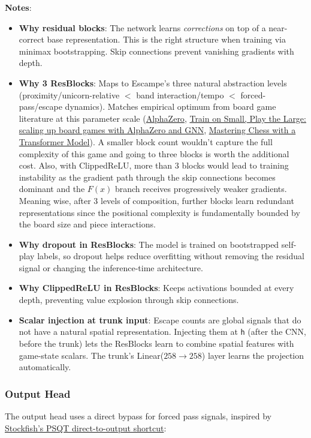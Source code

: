 \documentclass[11pt,a4paper]{article}
\begin{document}
\textbf{Notes}:
\begin{itemize}
  \item \textbf{Why residual blocks}: The network learns \emph{corrections} on top of a near-correct base representation. This is the right structure when training via minimax bootstrapping. Skip connections prevent vanishing gradients with depth.
  \item \textbf{Why 3 ResBlocks}: Maps to Escampe's three natural abstraction levels (proximity/unicorn-relative $<$ band interaction/tempo $<$ forced-pass/escape dynamics). Matches empirical optimum from board game literature at this parameter scale (\href{https://en.wikipedia.org/wiki/AlphaZero}{AlphaZero}, \href{https://arxiv.org/pdf/2107.08387}{Train on Small, Play the Large: scaling up board games with AlphaZero and GNN}, \href{https://arxiv.org/html/2409.12272v1#S6}{Mastering Chess with a Transformer Model}). A smaller block count wouldn't capture the full complexity of this game and going to three blocks is worth the additional cost. Also, with ClippedReLU, more than 3 blocks would lead to training instability as the gradient path through the skip connections becomes dominant and the $F(x)$ branch receives progressively weaker gradients. Meaning wise, after 3 levels of composition, further blocks learn redundant representations since the positional complexity is fundamentally bounded by the board size and piece interactions.
  \item \textbf{Why dropout in ResBlocks}: The model is trained on bootstrapped self-play labels, so dropout helps reduce overfitting without removing the residual signal or changing the inference-time architecture.
  \item \textbf{Why ClippedReLU in ResBlocks}: Keeps activations bounded at every depth, preventing value explosion through skip connections.
  \item \textbf{Scalar injection at trunk input}: Escape counts are global signals that do not have a natural spatial representation. Injecting them at \texttt{h} (after the CNN, before the trunk) lets the ResBlocks learn to combine spatial features with game-state scalars. The trunk's Linear($258\to258$) layer learns the projection automatically.
\end{itemize}

\newpage
\subsubsection{Output Head}
The output head uses a direct bypass for forced pass signals, inspired by \href{https://github.com/official-stockfish/Stockfish/blob/master/src/nnue/nnue_architecture.h}{Stockfish's PSQT direct-to-output shortcut}:
\end{document}
